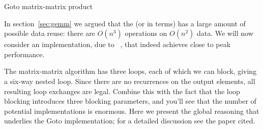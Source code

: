 
 {Goto matrix-matrix product}
\label{sec:goto-gemm}

In section~\ref{sec:gemm} we argued that the
(or  in  terms) has a large amount of
possible data reuse: there are $O(n^3)$ operations on $O(n^2)$ data.
We will now consider an implementation, due
to ~\cite{GotoGeijn:2008:Anatomy}, that
indeed achieves close to peak performance.

The matrix-matrix algorithm has three loops, each of which we can block,
giving a six-way nested loop.
Since there are no recurrences on the output elements, all resulting
loop exchanges are legal. Combine this with the fact that the loop blocking
introduces three blocking parameters, and you'll see that the number of
potential implementations is enormous. Here we present the global reasoning
that underlies the Goto implementation; for a detailed discussion see the paper cited.

